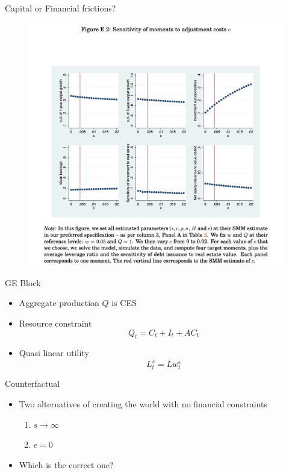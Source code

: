 \documentclass[english,xcolor=svgnames]{beamer}
\begin{document}
\begin{frame}{Capital or Financial frictions?}
\begin{figure}
\includegraphics[scale=0.35]{figures/cchst_2}
\end{figure}
\end{frame}

\begin{frame}{GE Block}
\begin{itemize}
\item Aggregate production $Q$ is CES
\item Resource constraint
\[Q_t = C_t + I_t + AC_t\]
\item Quasi linear utility
\[L^s_t = \bar{L} w^{\epsilon}_t\] 
\end{itemize}
\end{frame}

\begin{frame}{Counterfactual}
\begin{itemize}
\item Two alternatives of creating the world with no financial constraints
\begin{enumerate}
\item $s \rightarrow \infty$
\item $e = 0$
\end{enumerate}
\item Which is the correct one?
\end{itemize}
\end{frame}
\end{document}
